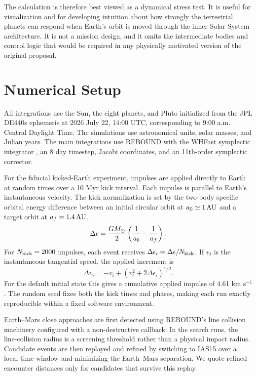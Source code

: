 \documentclass[twocolumn]{aastex631}
\begin{document}
The calculation is therefore best viewed as a dynamical stress test.  It is useful for visualization and for developing intuition about how strongly the terrestrial planets can respond when Earth's orbit is moved through the inner Solar System architecture.  It is not a mission design, and it omits the intermediate bodies and control logic that would be required in any physically motivated version of the original proposal.

\section{Numerical Setup}

All integrations use the Sun, the eight planets, and Pluto initialized from the JPL DE440s ephemeris at 2026 July 22, 14:00 UTC, corresponding to 9:00 a.m. Central Daylight Time.  The simulations use astronomical units, solar masses, and Julian years.  The main integrations use REBOUND \citep{rebound} with the WHFast symplectic integrator \citep{whfast}, an 8 day timestep, Jacobi coordinates, and an 11th-order symplectic corrector.

For the fiducial kicked-Earth experiment, impulses are applied directly to Earth at random times over a 10 Myr kick interval.  Each impulse is parallel to Earth's instantaneous velocity.  The kick normalization is set by the two-body specific orbital energy difference between an initial circular orbit at $a_0 \simeq 1\,{\rm AU}$ and a target orbit at $a_f = 1.4\,{\rm AU}$,
\begin{equation}
    \Delta \epsilon =
    {GM_\odot \over 2}\left({1 \over a_0} - {1 \over a_f}\right).
\end{equation}
For $N_{\rm kick}=2000$ impulses, each event receives $\Delta \epsilon_i = \Delta \epsilon/N_{\rm kick}$.  If $v_t$ is the instantaneous tangential speed, the applied increment is
\begin{equation}
    \Delta v_i = -v_t + \left(v_t^2 + 2\Delta\epsilon_i\right)^{1/2}.
\end{equation}
For the default initial state this gives a cumulative applied impulse of 4.61 km s$^{-1}$.  The random seed fixes both the kick times and phases, making each run exactly reproducible within a fixed software environment.

Earth--Mars close approaches are first detected using REBOUND's line collision machinery configured with a non-destructive callback.  In the search runs, the line-collision radius is a screening threshold rather than a physical impact radius.  Candidate events are then replayed and refined by switching to IAS15 \citep{ias15} over a local time window and minimizing the Earth--Mars separation.  We quote refined encounter distances only for candidates that survive this replay.
\end{document}
